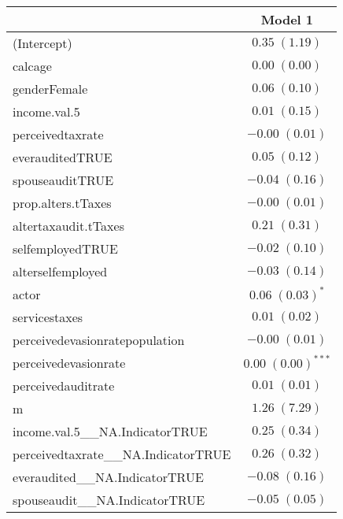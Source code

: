 
\begin{table}
\begin{tabular}{l c }
\hline
 & Model 1 \\
\hline
(Intercept)                                        & $0.35 \; (1.19)$        \\
calcage                                            & $0.00 \; (0.00)$        \\
genderFemale                                       & $0.06 \; (0.10)$        \\
income.val.5                                       & $0.01 \; (0.15)$        \\
perceivedtaxrate                                   & $-0.00 \; (0.01)$       \\
everauditedTRUE                                    & $0.05 \; (0.12)$        \\
spouseauditTRUE                                    & $-0.04 \; (0.16)$       \\
prop.alters.tTaxes                                 & $-0.00 \; (0.01)$       \\
altertaxaudit.tTaxes                               & $0.21 \; (0.31)$        \\
selfemployedTRUE                                   & $-0.02 \; (0.10)$       \\
alterselfemployed                                  & $-0.03 \; (0.14)$       \\
actor                                              & $0.06 \; (0.03)^{*}$    \\
servicestaxes                                      & $0.01 \; (0.02)$        \\
perceivedevasionratepopulation                     & $-0.00 \; (0.01)$       \\
perceivedevasionrate                               & $0.00 \; (0.00)^{***}$  \\
perceivedauditrate                                 & $0.01 \; (0.01)$        \\
m                                                  & $1.26 \; (7.29)$        \\
income.val.5\_\_NA.IndicatorTRUE                   & $0.25 \; (0.34)$        \\
perceivedtaxrate\_\_NA.IndicatorTRUE               & $0.26 \; (0.32)$        \\
everaudited\_\_NA.IndicatorTRUE                    & $-0.08 \; (0.16)$       \\
spouseaudit\_\_NA.IndicatorTRUE                    & $-0.05 \; (0.05)$       \\

\end{tabular}
\end{table}
